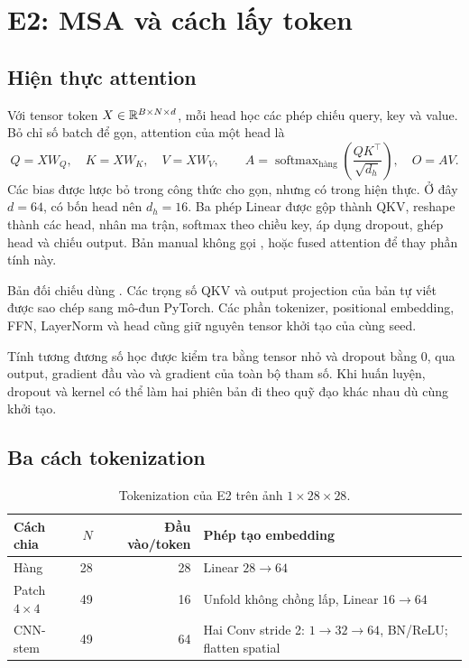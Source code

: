 \documentclass[12pt,a4paper]{report}
\begin{document}
\chapter{E2: MSA và cách lấy token}
\section{Hiện thực attention}
Với tensor token $X\in\mathbb{R}^{B\times N\times d}$, mỗi head học các phép chiếu query, key và value. Bỏ chỉ số batch để gọn, attention của một head là \cite{attention}
\begin{equation}
Q=XW_Q,\quad K=XW_K,\quad V=XW_V,\qquad
A=\operatorname{softmax}_{\text{hàng}}\left(\frac{QK^\top}{\sqrt{d_h}}\right),\quad O=AV.
\end{equation}
Các bias được lược bỏ trong công thức cho gọn, nhưng có trong hiện thực. Ở đây $d=64$, có bốn head nên $d_h=16$. Ba phép Linear được gộp thành QKV, reshape thành các head, nhân ma trận, softmax theo chiều key, áp dụng dropout, ghép head và chiếu output. Bản manual không gọi ,  hoặc fused attention để thay phần tính này.

Bản đối chiếu dùng . Các trọng số QKV và output projection của bản tự viết được sao chép sang mô-đun PyTorch. Các phần tokenizer, positional embedding, FFN, LayerNorm và head cũng giữ nguyên tensor khởi tạo của cùng seed.

Tính tương đương số học được kiểm tra bằng tensor nhỏ và dropout bằng 0, qua output, gradient đầu vào và gradient của toàn bộ tham số. Khi huấn luyện, dropout và kernel có thể làm hai phiên bản đi theo quỹ đạo khác nhau dù cùng khởi tạo.

\section{Ba cách tokenization}
\begin{table}[htbp]\centering
\begin{tabularx}{\textwidth}{@{}lrrX@{}}\toprule
Cách chia & $N$ & Đầu vào/token & Phép tạo embedding\\\midrule
Hàng & 28 & 28 & Linear $28\to64$\\
Patch $4\times4$ & 49 & 16 & Unfold không chồng lấp, Linear $16\to64$\\
CNN-stem & 49 & 64 & Hai Conv stride 2: $1\to32\to64$, BN/ReLU; flatten spatial\\\bottomrule
\end{tabularx}
\caption{Tokenization của E2 trên ảnh $1\times28\times28$.}
\end{table}
\end{document}
